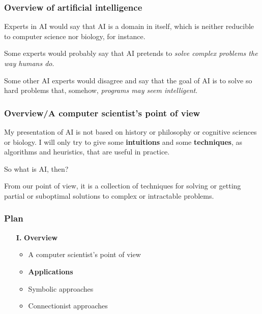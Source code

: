 
%
\begin{frame}
\frametitle{Overview of artificial intelligence}

Experts in AI would say that AI is a domain in itself, which is
neither reducible to computer science nor biology, for instance.

\bigskip

Some experts would probably say that AI pretends to \emph{solve
complex problems the way humans do}.

\bigskip

Some other AI experts would disagree and say that the goal of AI is to
solve so hard problems that, somehow, \emph{programs may seem
intelligent}.

\end{frame}

%
\begin{frame}
\frametitle{Overview/A computer scientist's
  point of view}

My presentation of AI is not based on history or philosophy or
cognitive sciences or biology. I will only try to give some
\textbf{intuitions} and some \textbf{techniques}, as algorithms and
heuristics, that are useful in practice.

\bigskip

So what is AI, then? 

\bigskip

From our point of view, it is a collection of techniques for solving
or getting partial or suboptimal solutions to complex or intractable
problems.

\end{frame}

%
\begin{frame}
\frametitle{Plan}

\begin{itemize}

  \item[\textbf{I.}] \textbf{Overview}

    \begin{itemize}

      \item A computer scientist's point of view

      \item \textbf{Applications}

      \item Symbolic approaches

      \item Connectionist approaches

    \end{itemize}

\end{itemize}

\end{frame}

